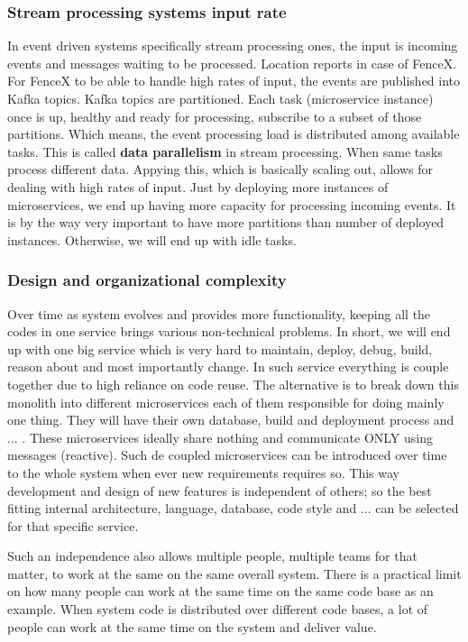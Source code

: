 \documentclass[a4]{report}
\begin{document}
    \subsubsection{Stream processing systems input rate}
    In event driven systems specifically stream processing ones, the input is incoming events and messages waiting to
    be processed.
    Location reports in case of FenceX.
    For FenceX to be able to handle high rates of input, the events are published into Kafka topics.
    Kafka topics are partitioned.
    Each task (microservice instance) once is up, healthy and ready for processing, subscribe to a subset of those
    partitions.
    Which means, the event processing load is distributed among available tasks.
    This is called \textbf{data parallelism} in stream processing.
    When same tasks process different data.
    Appying this, which is basically scaling out, allows for dealing with high rates of input.
    Just by deploying more instances of microservices, we end up having more capacity for processing incoming events.
    It is by the way very important to have more partitions than number of deployed instances.
    Otherwise, we will end up with idle tasks.

    \subsubsection{Design and organizational complexity}
    Over time as system evolves and provides more functionality, keeping all the codes in one service brings various
    non-technical problems.
    In short, we will end up with one big service which is very hard to maintain, deploy, debug, build, reason about
    and most importantly change.
    In such service everything is couple together due to high reliance on code reuse.
    The alternative is to break down this monolith into different microservices each of them responsible for doing
    mainly one thing.
    They will have their own database, build and deployment process and ... .
    These microservices ideally share nothing and communicate ONLY using messages (reactive).
    Such de coupled microservices can be introduced over time to the whole system when ever new requirements requires so.
    This way development and design of new features is independent of others;
    so the best fitting internal architecture, language, database, code style and ... can be selected for that specific
    service.

    Such an independence also allows multiple people, multiple teams for that matter, to work at the same on the same
    overall system.
    There is a practical limit on how many people can work at the same time on the same code base as an example.
    When system code is distributed over different code bases, a lot of people can work at the same time on the
    system and deliver value.
\end{document}
